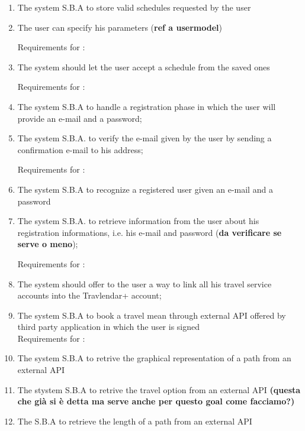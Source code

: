 \begin{enumerate}
\item The system S.B.A to store valid schedules requested by the user

\item The user can specify his parameters (\textbf{ref a usermodel})

Requirements for :

\item The system should let the user accept a schedule from the saved ones 

Requirements for :

\item The system S.B.A to handle a registration phase in which the user will provide an e-mail and a password;

\item The system S.B.A. to verify the e-mail given by the user by sending a confirmation e-mail to his address;

Requirements for :
\item The system S.B.A to recognize a registered user given an e-mail and a password \label{req:R9}

\item The system S.B.A. to retrieve information from the user about his registration informations, i.e. his e-mail and password (\textbf{da verificare se serve o meno}); \label{req:R10}

Requirements for : 

\item The system should offer to the user a way to link all his travel service accounts into the Travlendar+ account;

\item The system S.B.A to book a travel mean through external API offered by third party application in which the user is signed
\\

Requirements for :

\item The system S.B.A to retrive the graphical representation of a path from an external API 

\item The stystem S.B.A to retrive the travel option from an external API \textbf{(questa che già si è detta ma serve anche per questo goal come facciamo?)}

\item The S.B.A to retrieve the length of a path from an external API  



\end{enumerate}
